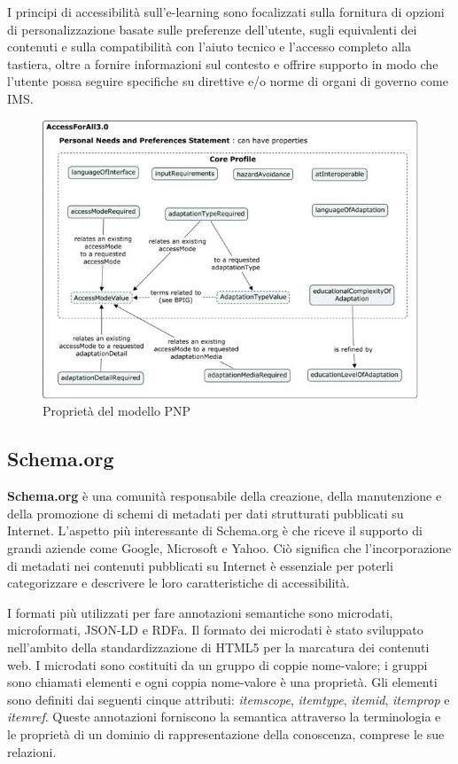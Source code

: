 I principi di accessibilità sull'e-learning sono focalizzati sulla fornitura di opzioni di personalizzazione basate sulle preferenze dell'utente, sugli equivalenti dei contenuti e sulla compatibilità con l'aiuto tecnico e l'accesso completo alla tastiera, oltre a fornire informazioni sul contesto e offrire supporto in modo che l'utente possa seguire specifiche su direttive e/o norme di organi di governo come IMS.

\begin{figure}[H]
\centering
\includegraphics[scale=0.7]{res/pnp.png}
\caption{Proprietà del modello PNP}
\label{fig:pnp}
\end{figure}

\subsection{Schema.org}
\textbf{Schema.org} è una comunità responsabile della creazione, della manutenzione e della promozione di schemi di metadati per dati strutturati pubblicati su Internet. L'aspetto più interessante di Schema.org è che riceve il supporto di grandi aziende come Google, Microsoft e Yahoo. Ciò significa che l'incorporazione di metadati nei contenuti pubblicati su Internet è essenziale per poterli categorizzare e descrivere le loro caratteristiche di accessibilità.

I formati più utilizzati per fare annotazioni semantiche sono microdati, microformati, JSON-LD e RDFa.
Il formato dei microdati è stato sviluppato nell'ambito della standardizzazione di HTML5 per la marcatura dei contenuti web. I microdati sono costituiti da un gruppo di coppie nome-valore; i gruppi sono chiamati elementi e ogni coppia nome-valore è una proprietà. Gli elementi sono definiti dai seguenti cinque attributi: \textit{itemscope}, \textit{itemtype}, \textit{itemid}, \textit{itemprop} e \textit{itemref}. Queste annotazioni forniscono la semantica attraverso la terminologia e le proprietà di un dominio di rappresentazione della conoscenza, comprese le sue relazioni.

